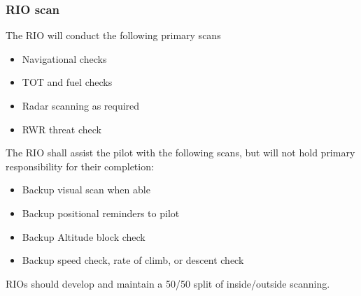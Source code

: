 \subsubsection{RIO scan}

The RIO will conduct the following primary scans

\begin{itemize}
  \item Navigational checks
  \item TOT and fuel checks
  \item Radar scanning as required
  \item RWR threat check
\end{itemize}

The RIO shall assist the pilot with the following scans, but will not hold
primary responsibility for their completion:

\begin{itemize}
  \item Backup visual scan when able
  \item Backup positional reminders to pilot
  \item Backup Altitude block check
  \item Backup speed check, rate of climb, or descent check
\end{itemize}

RIOs should develop and maintain a 50/50 split of inside/outside scanning.

